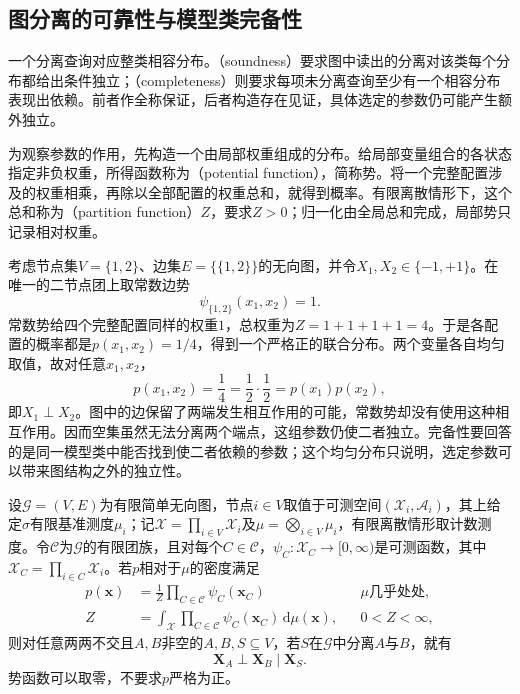 \subsection{图分离的可靠性与模型类完备性}
\label{sec:pgm-undirected-separation-soundness-completeness}

一个分离查询对应整类相容分布。（soundness）要求图中读出的分离对该类每个分布都给出条件独立；（completeness）则要求每项未分离查询至少有一个相容分布表现出依赖。前者作全称保证，后者构造存在见证，具体选定的参数仍可能产生额外独立。

为观察参数的作用，先构造一个由局部权重组成的分布。给局部变量组合的各状态指定非负权重，所得函数称为（potential function），简称势。将一个完整配置涉及的权重相乘，再除以全部配置的权重总和，就得到概率。有限离散情形下，这个总和称为（partition function）$Z$，要求$Z>0$；归一化由全局总和完成，局部势只记录相对权重。

\begin{example}[不分离不强迫固定分布相关]
  \label{ex:pgm-undirected-fixed-distribution-extra-independence}
  考虑节点集$V=\{1,2\}$、边集$E=\{\{1,2\}\}$的无向图，并令$X_1,X_2\in\{-1,+1\}$。在唯一的二节点团上取常数边势
  \[
    \psi_{\{1,2\}}(x_1,x_2)=1.
  \]
  常数势给四个完整配置同样的权重$1$，总权重为$Z=1+1+1+1=4$。于是各配置的概率都是$p(x_1,x_2)=1/4$，得到一个严格正的联合分布。两个变量各自均匀取值，故对任意$x_1,x_2$，
  \[
    p(x_1,x_2)=\frac14
    =\frac12\cdot\frac12
    =p(x_1)p(x_2),
  \]
  即$X_1\perp X_2$。图中的边保留了两端发生相互作用的可能，常数势却没有使用这种相互作用。因而空集虽然无法分离两个端点，这组参数仍使二者独立。完备性要回答的是同一模型类中能否找到使二者依赖的参数；这个均匀分布只说明，选定参数可以带来图结构之外的独立性。
\end{example}

\begin{theorem}[团因子分解分布上的分离可靠性]
  \label{thm:pgm-undirected-factorization-to-global}
  设$\mathcal{G}=(V,E)$为有限简单无向图，节点$i\in V$取值于可测空间$(\mathcal{X}_i,\mathcal{A}_i)$，其上给定$\sigma$有限基准测度$\mu_i$；记$\mathcal{X}=\prod_{i\in V}\mathcal{X}_i$及$\mu=\bigotimes_{i\in V}\mu_i$，有限离散情形取计数测度。令$\mathcal{C}$为$\mathcal{G}$的有限团族，且对每个$C\in\mathcal{C}$，$\psi_C:\mathcal{X}_C\to[0,\infty)$是可测函数，其中$\mathcal{X}_C=\prod_{i\in C}\mathcal{X}_i$。若$p$相对于$\mu$的密度满足
  \[
    \begin{aligned}
      p(\bm{x})
      &=\frac{1}{Z}\prod_{C\in\mathcal{C}}\psi_C(\bm{x}_C)
        &&\text{$\mu$几乎处处},\\
      Z
      &=\int_{\mathcal{X}}\prod_{C\in\mathcal{C}}
        \psi_C(\bm{x}_C)\,\mathrm{d}\mu(\bm{x}),
        &&0<Z<\infty,
    \end{aligned}
  \]
  则对任意两两不交且$A,B$非空的$A,B,S\subseteq V$，若$S$在$\mathcal{G}$中分离$A$与$B$，就有
  \[
    \bm{X}_A\perp\bm{X}_B\mid\bm{X}_S.
  \]
  势函数可以取零，不要求$p$严格为正。
\end{theorem}


